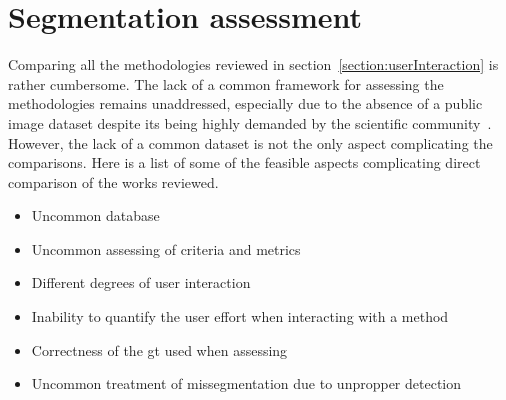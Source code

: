 \documentclass[authoryear,preprint,review,12pt]{elsarticle}
\begin{document}
\section{Segmentation assessment}\label{section:assessment}
Comparing all the methodologies reviewed in section~\ref{section:userInteraction} is rather cumbersome. The lack of a common framework for assessing the methodologies remains unaddressed, especially due to the absence of a public image dataset despite its being highly demanded by the scientific community~\cite{Noble:2006p1734,Noble:2009p14330,Cheng:2009p10580}. However, the lack of a common dataset is not the only aspect complicating the comparisons. Here is a list of some of the feasible aspects complicating direct comparison of the works reviewed.

\begin{itemize}
\item Uncommon database
\item Uncommon assessing of criteria and metrics
\item Different degrees of user interaction
\item Inability to quantify the user effort when interacting with a method
\item Correctness of the \ac{gt} used when assessing
\item Uncommon treatment of missegmentation due to unpropper detection
\end{itemize}

%
\end{document}

